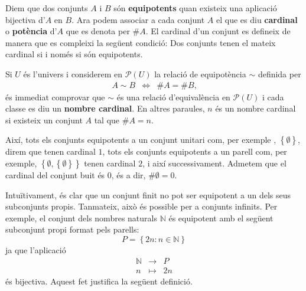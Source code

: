 \bigskip

Diem que dos conjunts $A$ i $B$ són \textbf{equipotents} quan existeix
una aplicació bijectiva d'$A$ en $B$. Ara podem associar a cada conjunt $%
A$ el que es diu \textbf{cardinal} o \textbf{potència} d'$A$ que es
denota per $\#A$. El cardinal d'un conjunt es defineix de manera que es
compleixi la següent condició: Dos conjunts tenen el mateix cardinal
si i només si són equipotents.

\bigskip

Si $U$ és l'univers i considerem en $\mathcal{P}(U)$ la relació de
equipotència $\sim$ definida per%
\begin{equation*}
\begin{array}{ccc}
A\sim B & \Longleftrightarrow & \#A=\#B\text{,}%
\end{array}
\end{equation*}
és immediat comprovar que $\sim$ és una relació d'equivalència en $\mathcal{P}(U)$ i cada classe es diu un \textbf{nombre cardinal}.
En altres paraules, $n$ és un nombre cardinal si existeix un conjunt $A$
tal que $\#A=n$.

\bigskip

Així, tots els conjunts equipotents a un conjunt unitari com, per
exemple , $\left\{ \emptyset\right\} $, direm que tenen cardinal $1$, tots
els conjunts equipotents a un parell com, per exemple, $\left\{ \emptyset
,\left\{ \emptyset\right\} \right\} $ tenen cardinal $2$, i així
successivament. Admetem que el cardinal del conjunt buit és $0$, és
a dir, $\#\emptyset=0$.

\bigskip

Intuïtivament, és clar que un conjunt finit no pot ser equipotent a
un dels seus subconjunts propis. Tanmateix, això és possible per a
conjunts infinits. Per exemple, el conjunt dels nombres naturals $\mathbb{N}$
és equipotent amb el següent subconjunt propi format pels parells:
\begin{equation*}
P=\left\{ 2n:n\in\mathbb{N}\right\}
\end{equation*}
ja que l'aplicació%
\begin{equation*}
\begin{array}{ccc}
\mathbb{N} & \longrightarrow & P \\
n & \longmapsto & 2n%
\end{array}
\end{equation*}
és bijectiva. Aquest fet justifica la següent definició.

\bigskip

